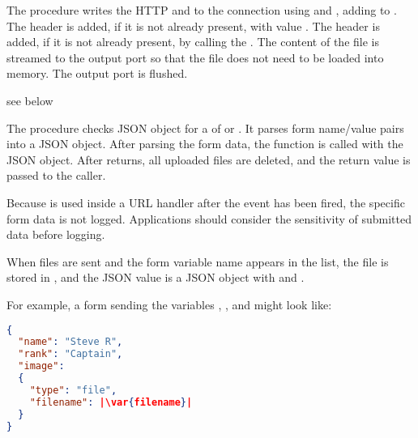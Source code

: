 \begin{procedure}
\end{procedure}
\returns{} 

The  procedure writes the HTTP 
and  to the connection  using
 and , adding
 to .  The 
header is added, if it is not already present, with value
.  The  header is added, if it
is not already present, by calling the .  The
content of the file is streamed to the output port so that the file
does not need to be loaded into memory. The output port is flushed.

\begin{procedure}
\end{procedure}
\returns{} see below

The  procedure checks JSON object
 for a  of 
or . It parses form name/value
pairs into a JSON object.  After parsing the form data, the function
 is called with the JSON object. After  returns, all
uploaded files are deleted, and the return value is passed to the
caller.

Because  is used inside a URL handler after
the  event has been fired, the specific form data
is not logged. Applications should consider the sensitivity of
submitted data before logging.

When files are sent and the form variable name appears in the
 list, the file is stored in , and the JSON
value is a JSON object with  and
.

For example, a form sending the variables , ,
and  might look like:

\begin{lstlisting}[language=json,frame=none]
{
  "name": "Steve R",
  "rank": "Captain",
  "image":
  {
    "type": "file",
    "filename": |\var{filename}|
  }
}
\end{lstlisting}

